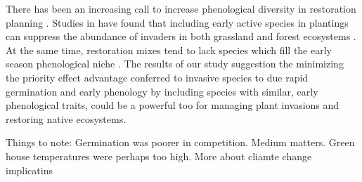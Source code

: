 \documentclass{article}\usepackage[]{graphicx}\usepackage[]{color}
\begin{document}
{There has been an increasing call to increase phenological diversity in restoration planning \citep{Hess:2019vn}. Studies in  have found that including early active species in plantings can suppress the abundance of invaders in both grassland \citep{Cleland:2013wo} and forest ecosystems \citep{Schuster:2020ww}. At the same time, restoration mixes tend to lack species which fill the early season phenological niche \citep{Havens:2016vo}. The results of our study suggestion the minimizing the priority effect advantage conferred to invasive species to due rapid germination and early phenology by including species with similar, early phenological traits, could be a powerful too for managing plant invasions and restoring native ecosystems.


Things to note: Germination was poorer in competition. Medium matters. Green house temperatures were perhaps too high.
More about cliamte change implicatins


}
\end{document}
